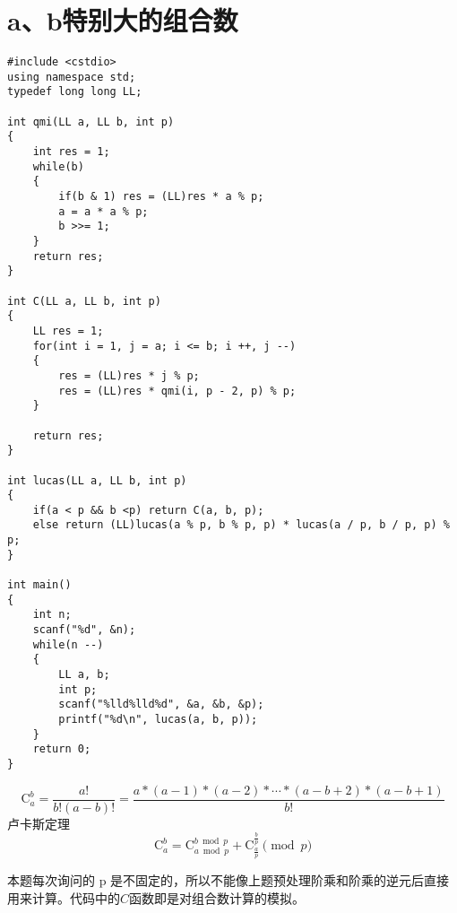 \documentclass[]{book}
\begin{document}
\section{a、b特别大的组合数}
\begin{lstlisting}
#include <cstdio>
using namespace std;
typedef long long LL;

int qmi(LL a, LL b, int p)
{
    int res = 1;
    while(b)
    {
        if(b & 1) res = (LL)res * a % p;
        a = a * a % p;
        b >>= 1;
    }
    return res;
}

int C(LL a, LL b, int p)
{
    LL res = 1;
    for(int i = 1, j = a; i <= b; i ++, j --)
    {
        res = (LL)res * j % p;
        res = (LL)res * qmi(i, p - 2, p) % p;
    }

    return res;
}

int lucas(LL a, LL b, int p)
{
    if(a < p && b <p) return C(a, b, p);
    else return (LL)lucas(a % p, b % p, p) * lucas(a / p, b / p, p) % p;
}

int main()
{
    int n;
    scanf("%d", &n);
    while(n --)
    {
        LL a, b;
        int p;
        scanf("%lld%lld%d", &a, &b, &p);
        printf("%d\n", lucas(a, b, p));
    }
    return 0;
}
\end{lstlisting}
\[ \mathrm{C}_a^b = \frac{a!}{b!(a-b)!} = \frac{a*(a-1)*(a-2)*\cdots*(a-b+2)*(a-b+1)}{b!}\]
卢卡斯定理
\[\mathrm{C}_a^b = \mathrm{C}_{a\bmod p}^{b\bmod p} + \mathrm{C}_{\frac{a}{p}}^{\frac{b}{p}} \pmod{p}\]

本题每次询问的 p 是不固定的，所以不能像上题预处理阶乘和阶乘的逆元后直接用来计算。代码中的$C$函数即是对组合数计算的模拟。
\end{document}
